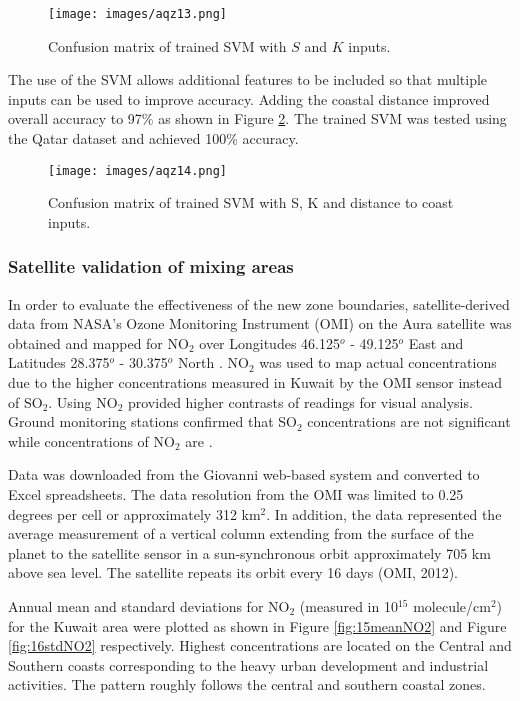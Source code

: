 %
\begin{figure}[H]
\centering
\texttt{[image: images/aqz13.png]} 
\caption{Confusion matrix of trained SVM with $S$ and $K$ inputs.}
\label{fig:13confusionSK}
\end{figure}
%

The use of the SVM allows additional features to be included so that multiple inputs can be used to improve accuracy. Adding the coastal distance improved overall accuracy to 97\% as shown in Figure \ref{fig:14confusionSKdist}. The trained SVM was tested using the Qatar dataset and achieved 100\% accuracy. 

%
\begin{figure}[H]
\centering
\texttt{[image: images/aqz14.png]} 
\caption{Confusion matrix of trained SVM with S, K and distance to coast inputs.}
\label{fig:14confusionSKdist}
\end{figure}
%
 
\subsubsection{Satellite validation of mixing areas}

In order to evaluate the effectiveness of the new zone boundaries, satellite-derived data from NASA’s Ozone Monitoring Instrument (OMI) on the Aura satellite was obtained and mapped for NO$_{2}$ over Longitudes 46.125$^{o}$ - 49.125$^{o}$ East and Latitudes 28.375$^{o}$ - 30.375$^{o}$ North \citep{Boersma2011, Strawa2013}.  NO$_{2}$ was used to map actual concentrations due to the higher concentrations measured in Kuwait by the OMI sensor instead of SO$_{2}$.  Using  NO$_{2}$ provided higher contrasts of readings for visual analysis. Ground monitoring stations confirmed that SO$_{2}$ concentrations are not significant while concentrations of NO$_{2}$ are \citep{Al-Awadhi2014}.

Data was downloaded from the Giovanni web-based system \citep{Acker2007} and converted to Excel spreadsheets.  The data resolution from the OMI was limited to 0.25 degrees per cell or approximately 312 km$^{2}$.  In addition, the data represented the average measurement of a vertical column extending from the surface of the planet to the satellite sensor in a sun-synchronous orbit approximately 705 km above sea level.  The satellite repeats its orbit every 16 days (OMI, 2012). 

Annual mean and standard deviations for NO$_{2}$ (measured in 10$^{15}$ molecule/cm$^{2}$) for the Kuwait area were plotted as shown in Figure \ref{fig:15meanNO2} and Figure \ref{fig:16stdNO2} respectively.  Highest concentrations are located on the Central and Southern coasts corresponding to the heavy urban development and industrial activities. The pattern roughly follows the central and southern coastal zones.


